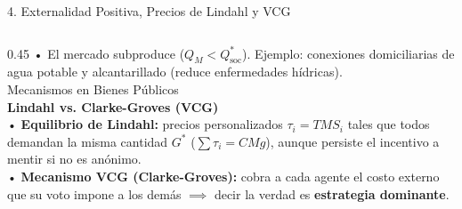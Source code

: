 \documentclass[aspectratio=169, 10pt]{beamer}
\begin{document}
\begin{frame}{4. Externalidad Positiva, Precios de Lindahl y VCG}
\begin{columns}[T]
    \begin{column}{0.45\textwidth}
      {\scriptsize
        • El mercado subproduce (\(Q_M < Q^*_{\text{soc}}\)). Ejemplo: conexiones domiciliarias de agua potable y alcantarillado (reduce enfermedades hídricas).\\[4pt]
      }
      {\scriptsize\color{grisTexto}Mecanismos en Bienes Públicos}\\[1pt]
      {\large\color{azulPrincipal}\textbf{Lindahl vs. Clarke-Groves (VCG)}}\\[4pt]
      {\scriptsize
        • \textbf{Equilibrio de Lindahl:} precios personalizados \(\tau_i = TMS_i\) tales que todos demandan la misma cantidad \(G^*\) (\(\sum \tau_i = CMg\)), aunque persiste el incentivo a mentir si no es anónimo.\\
        • \textbf{Mecanismo VCG (Clarke-Groves):} cobra a cada agente el costo externo que su voto impone a los demás \(\implies\) decir la verdad es \textbf{estrategia dominante}.
      }
    \end{column}
  \end{columns}

\end{frame}
\end{document}
